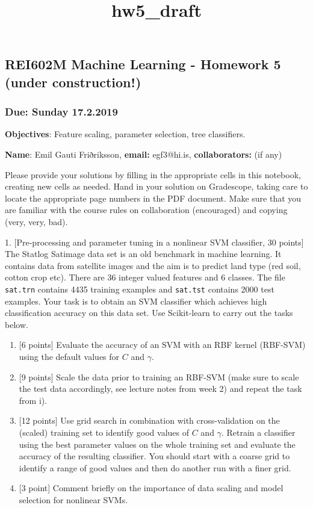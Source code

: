 \documentclass[11pt]{article}
\title{hw5\_draft}
\begin{document}
    
    
    \maketitle
    
    

    
    \subsection{REI602M Machine Learning - Homework 5 (under
construction!)}\label{rei602m-machine-learning---homework-5-under-construction}

\subsubsection{Due: Sunday 17.2.2019}\label{due-sunday-17.2.2019}

\textbf{Objectives}: Feature scaling, parameter selection, tree
classifiers.

\textbf{Name}: Emil Gauti Friðriksson, \textbf{email: } egf3@hi.is,
\textbf{collaborators:} (if any)

Please provide your solutions by filling in the appropriate cells in
this notebook, creating new cells as needed. Hand in your solution on
Gradescope, taking care to locate the appropriate page numbers in the
PDF document. Make sure that you are familiar with the course rules on
collaboration (encouraged) and copying (very, very, bad).

    1. {[}Pre-processing and parameter tuning in a nonlinear SVM classifier,
30 points{]} The Statlog Satimage data set is an old benchmark in
machine learning. It contains data from satellite images and the aim is
to predict land type (red soil, cotton crop etc). There are 36 integer
valued features and 6 classes. The file \texttt{sat.trn} contains 4435
training examples and \texttt{sat.tst} contains 2000 test examples. Your
task is to obtain an SVM classifier which achieves high classification
accuracy on this data set. Use Scikit-learn to carry out the tasks
below.

\begin{enumerate}
\def\labelenumi{\roman{enumi})}
\item
  {[}6 points{]} Evaluate the accuracy of an SVM with an RBF kernel
  (RBF-SVM) using the default values for \(C\) and \(\gamma\).
\item
  {[}9 points{]} Scale the data prior to training an RBF-SVM (make sure
  to scale the test data accordingly, see lecture notes from week 2) and
  repeat the task from i).
\item
  {[}12 points{]} Use grid search in combination with cross-validation
  on the (scaled) training set to identify good values of \(C\) and
  \(\gamma\). Retrain a classifier using the best parameter values on
  the whole training set and evaluate the accuracy of the resulting
  classifier. You should start with a coarse grid to identify a range of
  good values and then do another run with a finer grid.
\item
  {[}3 point{]} Comment briefly on the importance of data scaling and
  model selection for nonlinear SVMs.
\end{enumerate}
\end{document}
